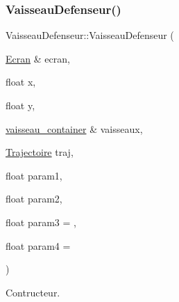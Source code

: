 \subsubsection{\texorpdfstring{Vaisseau\+Defenseur()}{VaisseauDefenseur()}}
{\footnotesize\ttfamily Vaisseau\+Defenseur\+::\+Vaisseau\+Defenseur (\begin{DoxyParamCaption}\item[{\mbox{\hyperlink{class_ecran}{Ecran}} \&}]{ecran,  }\item[{float}]{x,  }\item[{float}]{y,  }\item[{\mbox{\hyperlink{def__type_8h_ad123ed7c93f42c8dd68e4af28b16b639}{vaisseau\+\_\+container}} \&}]{vaisseaux,  }\item[{\mbox{\hyperlink{_trajectoire_8h_afa7f6e8323d7ee755d93cd1f6019dd95}{Trajectoire}}}]{traj,  }\item[{float}]{param1,  }\item[{float}]{param2,  }\item[{float}]{param3 = {},  }\item[{float}]{param4 = {} }\end{DoxyParamCaption})}



Contructeur. 


